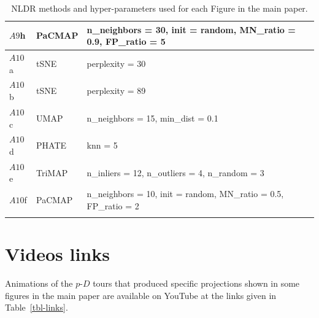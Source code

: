 \documentclass[
  12pt]{article}
\newcommand\pD{$p\text{-}D$}
\begin{document}
\begin{longtable}{>{\raggedright\arraybackslash}p{1.5cm}>{\raggedright\arraybackslash}p{2cm}>{\raggedright\arraybackslash}p{10cm}}
$A9$h & PaCMAP & n\_neighbors = 30, init = random, MN\_ratio = 0.9, FP\_ratio = 5\\
\midrule
$A10$a & tSNE & perplexity = 30\\
$A10$b & tSNE & perplexity = 89\\
$A10$c & UMAP & n\_neighbors = 15, min\_dist = 0.1\\
$A10$d & PHATE & knn = 5\\
$A10$e & TriMAP & n\_inliers = 12, n\_outliers = 4, n\_random = 3\\
$A10$f & PaCMAP & n\_neighbors = 10, init = random, MN\_ratio = 0.5, FP\_ratio = 2\\*


\caption{\label{tbl-fig-param}NLDR methods and hyper-parameters used for
each Figure in the main paper.}

\tabularnewline
\end{longtable}

\endgroup{}

\section{Videos links}\label{videos-links}

Animations of the \pD{} tours that produced specific projections shown
in some figures in the main paper are available on YouTube at the links
given in Table~\ref{tbl-links}.

\begin{table}[H]


\caption{\label{tbl-links}Videos of the langevitour animations and the
linked plots.}

\end{table}%
\end{document}
